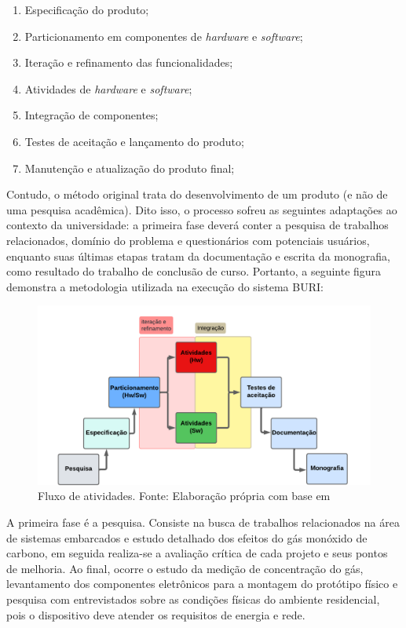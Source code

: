 \begin{enumerate}
    \item Especificação do produto;
    \item Particionamento em componentes de \textit{hardware} e \textit{software};
    \item Iteração e refinamento das funcionalidades;
    \item Atividades de \textit{hardware} e \textit{software};
    \item Integração de componentes;
    \item Testes de aceitação e lançamento do produto;
    \item Manutenção e atualização do produto final;
\end{enumerate}

Contudo, o método original trata do desenvolvimento de um produto (e não de uma pesquisa acadêmica). Dito isso, o processo sofreu as seguintes 
adaptações ao contexto da universidade: a primeira fase deverá conter a pesquisa de trabalhos relacionados, domínio do problema e questionários com potenciais usuários, enquanto suas últimas etapas tratam da documentação e escrita 
da monografia, como resultado do trabalho de conclusão de curso. Portanto, a seguinte figura demonstra a metodologia utilizada na execução do sistema BURI: 

\begin{figure}[ht]
\centering
\includegraphics[width=.82\textwidth]{img/diagrama-metodologia.png}
\caption{Fluxo de atividades. Fonte: Elaboração própria com base  em \cite{system-design-IOT}}\label{figMetodologia}
\end{figure}

A primeira fase é a pesquisa. Consiste na busca de trabalhos relacionados na área de sistemas embarcados 
e estudo detalhado dos efeitos do gás monóxido de carbono, em seguida realiza-se a avaliação crítica de cada projeto 
e seus pontos de melhoria. Ao final, ocorre o estudo da medição de concentração do gás, levantamento dos componentes 
eletrônicos para a montagem do protótipo físico e pesquisa com entrevistados sobre as condições físicas do ambiente residencial, pois o
dispositivo deve atender os requisitos de energia e rede.

